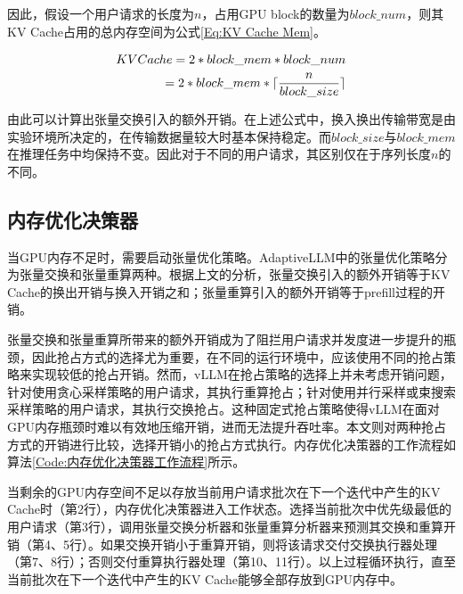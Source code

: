 因此，假设一个用户请求的长度为$n$，占用GPU block的数量为$block\_num$，则其KV Cache占用的总内存空间为公式\ref{Eq:KV Cache Mem}。

\begin{equation}
  \begin{aligned}
    KVCache = 2 * block\_mem * block\_num  \\ =  2 * block\_mem * \lceil \frac{n}{block\_size} \rceil
  \end{aligned}
  \label{Eq:KV Cache Mem}
  \setlength{\abovedisplayskip}{0ex}
  \setlength{\belowdisplayskip}{2ex}
\end{equation}

由此可以计算出张量交换引入的额外开销。在上述公式中，换入换出传输带宽是由实验环境所决定的，在传输数据量较大时基本保持稳定。而$block\_size$与$block\_mem$在推理任务中均保持不变。因此对于不同的用户请求，其区别仅在于序列长度$n$的不同。

\subsection{内存优化决策器}
当GPU内存不足时，需要启动张量优化策略。AdaptiveLLM中的张量优化策略分为张量交换和张量重算两种。根据上文的分析，张量交换引入的额外开销等于KV Cache的换出开销与换入开销之和；张量重算引入的额外开销等于prefill过程的开销。
\par
张量交换和张量重算所带来的额外开销成为了阻拦用户请求并发度进一步提升的瓶颈，因此抢占方式的选择尤为重要，在不同的运行环境中，应该使用不同的抢占策略来实现较低的抢占开销。然而，vLLM在抢占策略的选择上并未考虑开销问题，针对使用贪心采样策略的用户请求，其执行重算抢占；针对使用并行采样或束搜索采样策略的用户请求，其执行交换抢占。这种固定式抢占策略使得vLLM在面对GPU内存瓶颈时难以有效地压缩开销，进而无法提升吞吐率。本文则对两种抢占方式的开销进行比较，选择开销小的抢占方式执行。内存优化决策器的工作流程如算法\ref{Code:内存优化决策器工作流程}所示。
\par
当剩余的GPU内存空间不足以存放当前用户请求批次在下一个迭代中产生的KV Cache时（第2行），内存优化决策器进入工作状态。选择当前批次中优先级最低的用户请求（第3行），调用张量交换分析器和张量重算分析器来预测其交换和重算开销（第4、5行）。如果交换开销小于重算开销，则将该请求交付交换执行器处理（第7、8行）；否则交付重算执行器处理（第10、11行）。以上过程循环执行，直至当前批次在下一个迭代中产生的KV Cache能够全部存放到GPU内存中。 

